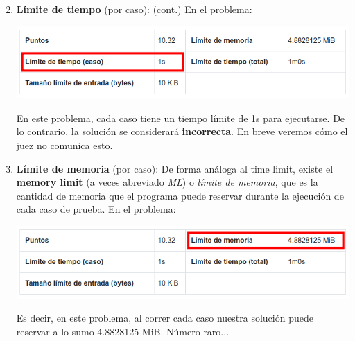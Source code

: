 \documentclass{beamer}
\begin{document}
    \begin{frame}[noframenumbering]
        \begin{enumerate}
            \setcounter{enumi}{1}
            \item \textbf{Límite de tiempo} (por caso): (cont.) En el problema: \pause

            \begin{center}
                \includegraphics[width=.6\linewidth]{./res/ou_tl.png}
            \end{center} \pause

            En este problema, cada caso tiene un tiempo límite de 1s para ejecutarse. De lo contrario, la solución se considerará \textbf{incorrecta}. En breve veremos cómo el juez no comunica esto.

        \item \textbf{Límite de memoria} (por caso): \pause De forma análoga al time limit, existe el \textbf{memory limit} (a veces abreviado \textit{ML}) o \textit{límite de memoria}, que es la cantidad de memoria que el programa puede reservar durante la ejecución de cada caso de prueba. \pause En el problema: \pause
            \begin{center}
                \includegraphics[width=.6\linewidth]{./res/ou_ml.png}
            \end{center} \pause

            Es decir, en este problema, al correr cada caso nuestra solución puede reservar a lo sumo 4.8828125 MiB. \pause Número raro...
        \end{enumerate}
    \end{frame}
\end{document}
